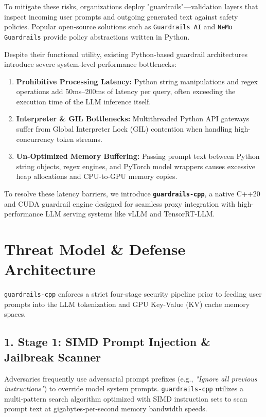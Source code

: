 \documentclass[11pt,onecolumn,a4paper]{article}
\begin{document}
To mitigate these risks, organizations deploy "guardrails"—validation layers that inspect incoming user prompts and outgoing generated text against safety policies. Popular open-source solutions such as \texttt{Guardrails AI} \cite{guardrailsai2023} and \texttt{NeMo Guardrails} \cite{reuchert2023nemo} provide policy abstractions written in Python.

Despite their functional utility, existing Python-based guardrail architectures introduce severe system-level performance bottlenecks:
\begin{enumerate}
    \item \textbf{Prohibitive Processing Latency:} Python string manipulations and regex operations add 50ms--200ms of latency per query, often exceeding the execution time of the LLM inference itself.
    \item \textbf{Interpreter & GIL Bottlenecks:} Multithreaded Python API gateways suffer from Global Interpreter Lock (GIL) contention when handling high-concurrency token streams.
    \item \textbf{Un-Optimized Memory Buffering:} Passing prompt text between Python string objects, regex engines, and PyTorch model wrappers causes excessive heap allocations and CPU-to-GPU memory copies.
\end{enumerate}

To resolve these latency barriers, we introduce \textbf{\texttt{guardrails-cpp}}, a native C++20 and CUDA guardrail engine designed for seamless proxy integration with high-performance LLM serving systems like vLLM \cite{kwon2023efficient} and TensorRT-LLM.

\section{Threat Model \& Defense Architecture}

\texttt{guardrails-cpp} enforces a strict four-stage security pipeline prior to feeding user prompts into the LLM tokenization and GPU Key-Value (KV) cache memory spaces.

\subsection{1. Stage 1: SIMD Prompt Injection & Jailbreak Scanner}
Adversaries frequently use adversarial prompt prefixes (e.g., \textit{"Ignore all previous instructions"}) to override model system prompts. \texttt{guardrails-cpp} utilizes a multi-pattern search algorithm optimized with SIMD instruction sets to scan prompt text at gigabytes-per-second memory bandwidth speeds.
\end{document}
